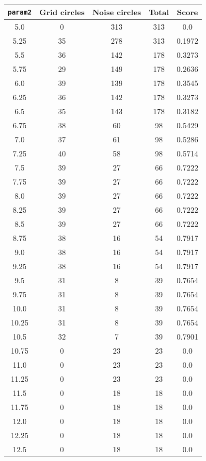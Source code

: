 \documentclass[letterpaper, 12pt]{article}
\begin{document}
\begin{longtable}{|c|c|c|c|c|}
\hline
\textbf{\texttt{param2}} & \textbf{Grid circles} & \textbf{Noise circles} & \textbf{Total} & \textbf{Score} \\
\hline
5.0 & 0 & 313 & 313 & 0.0 \\
\hline
5.25 & 35 & 278 & 313 & 0.1972 \\
\hline
5.5 & 36 & 142 & 178 & 0.3273 \\
\hline
5.75 & 29 & 149 & 178 & 0.2636 \\
\hline
6.0 & 39 & 139 & 178 & 0.3545 \\
\hline
6.25 & 36 & 142 & 178 & 0.3273 \\
\hline
6.5 & 35 & 143 & 178 & 0.3182 \\
\hline
6.75 & 38 & 60 & 98 & 0.5429 \\
\hline
7.0 & 37 & 61 & 98 & 0.5286 \\
\hline
7.25 & 40 & 58 & 98 & 0.5714 \\
\hline
7.5 & 39 & 27 & 66 & 0.7222 \\
\hline
7.75 & 39 & 27 & 66 & 0.7222 \\
\hline
8.0 & 39 & 27 & 66 & 0.7222 \\
\hline
8.25 & 39 & 27 & 66 & 0.7222 \\
\hline
8.5 & 39 & 27 & 66 & 0.7222 \\
\hline
8.75 & 38 & 16 & 54 & 0.7917 \\
\hline
9.0 & 38 & 16 & 54 & 0.7917 \\
\hline
9.25 & 38 & 16 & 54 & 0.7917 \\
\hline
9.5 & 31 & 8 & 39 & 0.7654 \\
\hline
9.75 & 31 & 8 & 39 & 0.7654 \\
\hline
10.0 & 31 & 8 & 39 & 0.7654 \\
\hline
10.25 & 31 & 8 & 39 & 0.7654 \\
\hline
10.5 & 32 & 7 & 39 & 0.7901 \\
\hline
10.75 & 0 & 23 & 23 & 0.0 \\
\hline
11.0 & 0 & 23 & 23 & 0.0 \\
\hline
11.25 & 0 & 23 & 23 & 0.0 \\
\hline
11.5 & 0 & 18 & 18 & 0.0 \\
\hline
11.75 & 0 & 18 & 18 & 0.0 \\
\hline
12.0 & 0 & 18 & 18 & 0.0 \\
\hline
12.25 & 0 & 18 & 18 & 0.0 \\
\hline
12.5 & 0 & 18 & 18 & 0.0 \\

\end{longtable}
\end{document}
